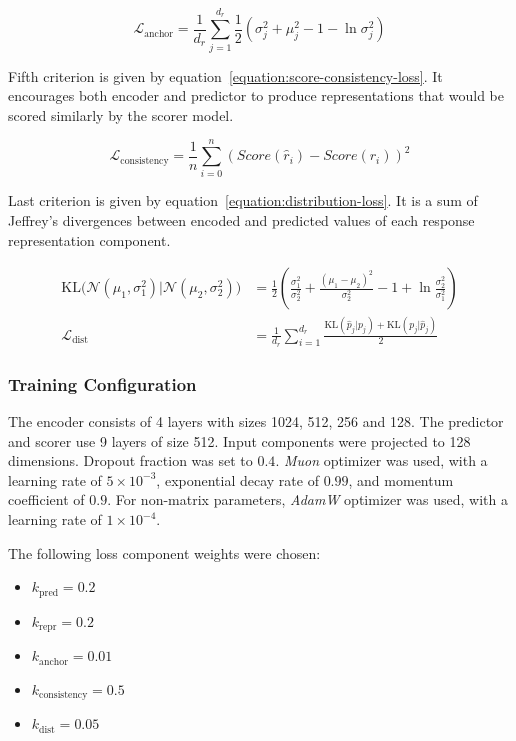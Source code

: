 \documentclass[a4paper,11pt,twoside]{report}
\theoremstyle{definition}
\begin{document}
\begin{equation}
\label{equation:kl-anchor-loss}
    \mathcal{L}_\text{anchor} = \frac{1}{d_r}\sum_{j=1}^{d_r} \frac{1}{2}\left(\sigma_j^2 + \mu_j^2 - 1 - \ln\sigma_j^2\right) 
\end{equation}

Fifth criterion is given by equation~\ref{equation:score-consistency-loss}. It encourages both encoder and predictor to produce representations that would be scored similarly by the scorer model.

\begin{equation}
\label{equation:score-consistency-loss}
    \mathcal{L}_\text{consistency} = \frac{1}{n} \sum_{i=0}^{n} (Score(\hat{r}_i) - Score(r_i))^2
\end{equation}

Last criterion is given by equation~\ref{equation:distribution-loss}. It is a sum of Jeffrey's divergences \cite{jeffreys1946invariant} between encoded and predicted values of each response representation component.

\begin{align}
\label{equation:distribution-loss}
    \text{KL}\bigl(\mathcal{N}(\mu_1,\sigma_1^2)|\mathcal{N}(\mu_2,\sigma_2^2)\bigr) & = \frac{1}{2}\left(\frac{\sigma_1^2}{\sigma_2^2} + \frac{(\mu_1-\mu_2)^2}{\sigma_2^2} - 1 + \ln\frac{\sigma_2^2}{\sigma_1^2}\right) \\
    \mathcal{L}_\text{dist} & = \frac{1}{d_r} \sum_{i=1}^{d_r} \frac{\text{KL}(\hat p_j | p_j)+\text{KL}(p_j| \hat p_j)}{2}
\end{align}

\subsubsection{Training Configuration}

The encoder consists of 4 layers with sizes 1024, 512, 256 and 128. The predictor and scorer use 9 layers of size 512. Input components were projected to 128 dimensions. Dropout fraction was set to $0.4$. \textit{Muon} optimizer was used, with a learning rate of $5 \times 10^{-3}$, exponential decay rate of $0.99$, and momentum coefficient of $0.9$. For non-matrix parameters, \textit{AdamW} optimizer was used, with a learning rate of $1 \times 10^{-4}$.

The following loss component weights were chosen:

\begin{itemize}
    \item $k_\text{pred} = 0.2$
    \item $k_\text{repr} = 0.2$
    \item $k_\text{anchor} = 0.01$
    \item $k_\text{consistency} = 0.5$
    \item $k_\text{dist} = 0.05$
\end{itemize}
\end{document}
